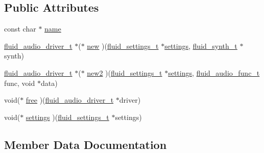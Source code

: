 \subsection*{Public Attributes}
\begin{DoxyCompactItemize}
\item 
const char $\ast$ \hyperlink{struct__fluid__audriver__definition__t_ac6f6d3b04bd81614f06f51ac31ca0940}{name}
\item 
\hyperlink{types_8h_ac3706330ce49cac5b7dd079e90d376d8}{fluid\+\_\+audio\+\_\+driver\+\_\+t} $\ast$($\ast$ \hyperlink{struct__fluid__audriver__definition__t_adcd98122cacea67bb2fad99d5fadaf36}{new} )(\hyperlink{types_8h_aa363402d3c77333b0f070ba531d034ba}{fluid\+\_\+settings\+\_\+t} $\ast$\hyperlink{struct__fluid__audriver__definition__t_aee73dfdbac8dba21dc75b7ee0babe90f}{settings}, \hyperlink{types_8h_ae265f10ae174a13afe010de50d87e1a4}{fluid\+\_\+synth\+\_\+t} $\ast$synth)
\item 
\hyperlink{types_8h_ac3706330ce49cac5b7dd079e90d376d8}{fluid\+\_\+audio\+\_\+driver\+\_\+t} $\ast$($\ast$ \hyperlink{struct__fluid__audriver__definition__t_add3ac8fe0637ad8ab60bda012a09d17a}{new2} )(\hyperlink{types_8h_aa363402d3c77333b0f070ba531d034ba}{fluid\+\_\+settings\+\_\+t} $\ast$\hyperlink{struct__fluid__audriver__definition__t_aee73dfdbac8dba21dc75b7ee0babe90f}{settings}, \hyperlink{audio_8h_a3bcb63db55c58403dad66496422ec462}{fluid\+\_\+audio\+\_\+func\+\_\+t} func, void $\ast$data)
\item 
void($\ast$ \hyperlink{struct__fluid__audriver__definition__t_ab85eeaaeb690cc72eda41dac40fd21ac}{free} )(\hyperlink{types_8h_ac3706330ce49cac5b7dd079e90d376d8}{fluid\+\_\+audio\+\_\+driver\+\_\+t} $\ast$driver)
\item 
void($\ast$ \hyperlink{struct__fluid__audriver__definition__t_aee73dfdbac8dba21dc75b7ee0babe90f}{settings} )(\hyperlink{types_8h_aa363402d3c77333b0f070ba531d034ba}{fluid\+\_\+settings\+\_\+t} $\ast$settings)
\end{DoxyCompactItemize}


\subsection{Member Data Documentation}
\mbox{\label{struct__fluid__audriver__definition__t_ab85eeaaeb690cc72eda41dac40fd21ac}} 
